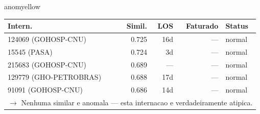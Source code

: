 \documentclass[a4paper,10pt]{article}
\begin{document}
\begin{anomalycard}[Internacao 119962 | GHO-BRADESCO | MODERADO (z=2.39)]{anomyellow}
\begin{tabular}{l r r r l}\toprule\textbf{Intern.} & \textbf{Simil.} & \textbf{LOS} & \textbf{Faturado} & \textbf{Status} \\\midrule
124069 (GOHOSP-CNU) & 0.725 & 16d & --- & \textcolor{jcubeblue}{normal} \\
15545 (PASA) & 0.724 & 3d & --- & \textcolor{jcubeblue}{normal} \\
215683 (GOHOSP-CNU) & 0.689 & --- & --- & \textcolor{jcubeblue}{normal} \\
129779 (GHO-PETROBRAS) & 0.688 & 17d & --- & \textcolor{jcubeblue}{normal} \\
91091 (GOHOSP-CNU) & 0.686 & 14d & --- & \textcolor{jcubeblue}{normal} \\
\multicolumn{5}{l}{\textcolor{jcubeblue}{\small $\rightarrow$ Nenhuma similar e anomala --- esta internacao e verdadeiramente atipica.}} \\
\bottomrule\end{tabular}


\end{anomalycard}

\newpage
\end{document}
